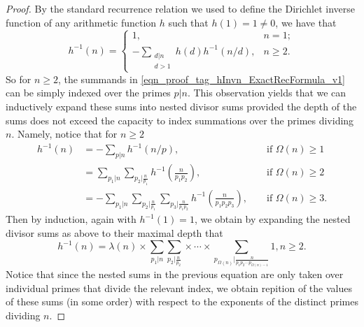 \documentclass[11pt,reqno,a4letter]{article}
\numberwithin{figure}{section}
\numberwithin{table}{section}
\theoremstyle{plain}
\numberwithin{theorem}{section}
\theoremstyle{definition}
\begin{document}
\begin{proof}
By the standard recurrence relation we used to define the Dirichlet inverse function of any 
arithmetic function $h$ such that $h(1) = 1 \neq 0$, 
we have that 
\begin{equation} 
\label{eqn_proof_tag_hInvn_ExactRecFormula_v1}
h^{-1}(n) = \begin{cases} 
            1, & n = 1; \\ 
            -\sum\limits_{\substack{d|n \\ d>1}} h(d) h^{-1}(n/d), & n \geq 2. 
            \end{cases} 
\end{equation} 
So for $n \geq 2$, the summands in \eqref{eqn_proof_tag_hInvn_ExactRecFormula_v1} 
can be simply indexed over the primes $p|n$. This observation yields that we can inductively 
expand these sums into nested divisor sums provided the depth of the sums does not exceed the 
capacity to index summations over the primes dividing $n$. Namely, notice that for $n \geq 2$ 
\begin{align*} 
h^{-1}(n) & = -\sum_{p|n} h^{-1}(n/p), && \text{\ if\ } \Omega(n) \geq 1 \\ 
     & = \sum_{p_1|n} \sum_{p_2|\frac{n}{p_1}} h^{-1}\left(\frac{n}{p_1p_2}\right), && \text{\ if\ } \Omega(n) \geq 2 \\ 
     & = -\sum_{p_1|n} \sum_{p_2|\frac{n}{p_1}} \sum_{p_3|\frac{n}{p_1p_2}} h^{-1}\left(\frac{n}{p_1p_2p_3}\right), 
     && \text{\ if\ } \Omega(n) \geq 3. 
\end{align*} 
Then by induction, again with $h^{-1}(1) = 1$, we obtain by expanding the 
nested divisor sums as above to their maximal depth that 
\[
h^{-1}(n) = \lambda(n) \times \sum_{p_1|n} \sum_{p_2|\frac{n}{p_2}} \times \cdots \times 
     \sum_{p_{\Omega(n)}|\frac{n}{p_1p_2 \cdots p_{\Omega(n)-1}}} 1, n \geq 2. 
\]
Notice that since the nested sums in the previous equation are only taken over individual primes 
that divide the relevant index, 
we obtain repition of the values of these sums (in some order) 
with respect to the exponents of the distinct primes dividing $n$. 


\end{proof}
\end{document}
